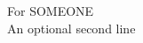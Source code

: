 \vspace*{6cm}
\begin{center}
For SOMEONE
\\[8pt]
An optional second line
\end{center}
\vspace*{\fill}
